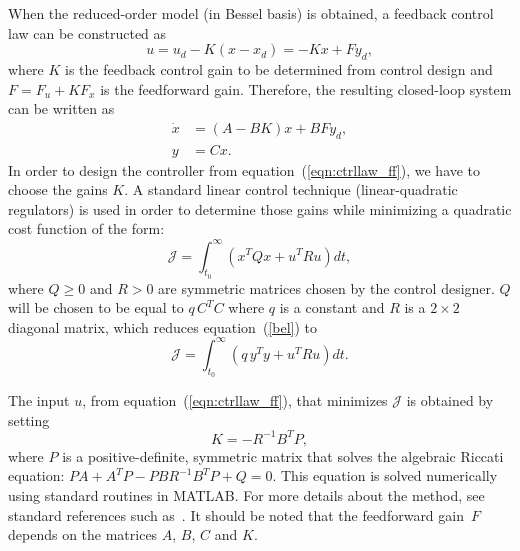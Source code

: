 \documentclass{iopart}
\begin{document}
When the reduced-order model (in Bessel basis) is obtained, a feedback control law can be constructed as
\begin{equation}
   u = u_{d} - K(x - x_{d}) = - Kx + Fy_{d},
   \label{eqn:ctrllaw_ff}
\end{equation}
where $K$ is the feedback control gain to be determined from control design and $F = F_u + K F_x$ is the feedforward gain.  Therefore, the resulting closed-loop system can be written as
\begin{equation}
\begin{aligned}
      \dot{x} &= (A-BK) x + BF y_{d}, \\
      y &= C x.
\end{aligned}\label{eq:4}
\end{equation}
In order to design the controller from equation~(\ref{eqn:ctrllaw_ff}), we have to choose the gains $K$.
A  standard linear control technique (linear-quadratic regulators) is used in order to determine those gains while minimizing a quadratic cost function of the form:
\begin{equation}
 \mathcal{J} = \int_{t_0}^\infty \left( x^T Q x + u^T R u \right) dt,
 \label{bel}
\end{equation}
where $Q\ge 0$ and $R>0$ are symmetric matrices chosen by the control designer. $Q$ will be chosen to be equal to $q \, C^{T} C$ where $q$ is a constant and $R$ is a $2 \times 2$ diagonal matrix, which reduces equation~(\ref{bel}) to
\begin{equation}
   \mathcal{J} = \int_{t_0}^\infty \left( q \, y^T y + u^T R u \right) dt.
\end{equation}

 
The input $u$, from equation~(\ref{eqn:ctrllaw_ff}), that minimizes $\mathcal{J}$ is obtained by setting
\begin{equation}
   K  = - R^{-1} B^T P,
\end{equation}
where $P$ is a positive-definite, symmetric matrix that solves the algebraic Riccati equation: $P {A} + {A}^T P - P {B} R^{-1} B^T P + Q = 0$.  This equation is solved numerically using standard routines in MATLAB. For more details about the method, see standard references such as~\cite{SandP, AandM}.
It should be noted that the feedforward gain~$F$  depends on the matrices $A$, $B$, $C$ and $K$.
\end{document}
